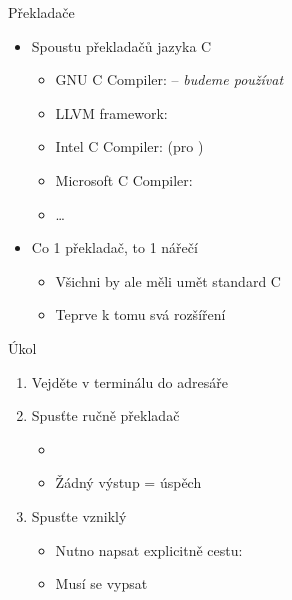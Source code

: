 \begin{frame}{Překladače}

  \begin{itemize}
    \item Spoustu překladačů jazyka C
    \begin{itemize}
      \item GNU C Compiler:  -- \emph{budeme používat}
      \item LLVM framework: 
      \item Intel C Compiler:  (pro \xes)
      \item Microsoft C Compiler: 
      \item \dots
    \end{itemize}

    \pause

    \item Co 1 překladač, to 1 nářečí
    \begin{itemize}
      \item Všichni by ale měli umět standard C
      \item Teprve k tomu svá rozšíření
    \end{itemize}

  \end{itemize}

\end{frame}

\begin{frame}{Úkol}

  \begin{enumerate}
    \item Vejděte v terminálu do adresáře 

    \item Spusťte ručně překladač
    \begin{itemize}
      \item {}
      \item Žádný výstup = úspěch
    \end{itemize}

    \item Spusťte vzniklý 
    \begin{itemize}
      \item Nutno napsat explicitně cestu: 
      \item Musí se vypsat 
    \end{itemize}
  \end{enumerate}

\end{frame}

